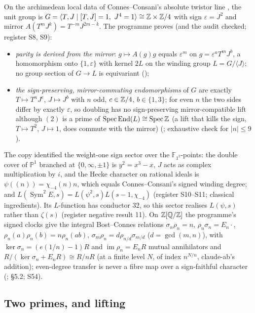On the archimedean local data of Connes--Consani's absolute twistor line \cite{CCtwistor}, the unit group is $G=\langle T,J\mid[T,J]=1,\ J^4=1\rangle\cong\ZZ\times\ZZ/4$ with sign $\varepsilon=J^2$ and mirror $A(T^mJ^k)=T^{-m}J^{2m-k}$. The programme proves (and the audit checked; register S8, S9):
\begin{itemize}
\item \emph{parity is derived from the mirror}: $g\mapsto A(g)g$ equals $\varepsilon^m$ on $g=\varepsilon^aT^mJ^b$, a homomorphism onto $\{1,\varepsilon\}$ with kernel $2L$ on the winding group $L=G/\langle J\rangle$; no group section of $G\to L$ is equivariant ();
\item \emph{the sign-preserving, mirror-commuting endomorphisms} of $G$ are exactly $T\mapsto T^nJ^c$, $J\mapsto J^b$ with $n$ odd, $c\in\mathbb{Z}/4$, $b\in\{1,3\}$; for even $n$ the two sides differ by exactly $\varepsilon$, so doubling has no sign-preserving mirror-compatible lift although $(2)$ is a prime of $\operatorname{Spec}\operatorname{End}(L)\cong\operatorname{Spec}\mathbb{Z}$ (a lift that kills the sign, $T\mapsto T^2$, $J\mapsto1$, does commute with the mirror) (; exhaustive check for $|n|\le9$).
\end{itemize}
The copy identified the weight-one sign sector over the $\mathbb{F}_{1^2}$-points: the double cover of $\mathbb{P}^1$ branched at $\{0,\infty,\pm1\}$ is $y^2=x^3-x$, $J$ acts as complex multiplication by $i$, and the Hecke character on rational ideals is $\psi((n))=\chi_{-4}(n)n$, which equals Connes--Consani's signed winding degree; and $L(\operatorname{Sym}^2E,s)=L(\psi^2,s)L(s-1,\chi_{-4})$ (register S10--S11; classical ingredients). Its $L$-function has conductor $32$, so this sector realises $L(\psi,s)$ rather than $\zeta(s)$ (register negative result 11).
On $\mathbb{Z}[\mathbb{Q}/\mathbb{Z}]$ the programme's signed clocks give the integral Bost--Connes relations $\sigma_n\rho_n=n$, $\rho_n\sigma_n=E_n\cdot$, $\rho_n(a)\rho_n(b)=n\rho_n(ab)$, $\sigma_m\rho_n=d\rho_{n/d}\sigma_{m/d}$ ($d=\gcd(m,n)$), with $\ker\sigma_n=(e(1/n)-1)R$ and $\operatorname{im}\rho_n=E_nR$ mutual annihilators and $R/(\ker\sigma_n+E_nR)\cong R/nR$ (at a finite level $N$, of index $n^{N/n}$, claude-ab's addition); even-degree transfer is never a fibre map over a sign-faithful character (;  §5.2; S54).

\subsection{Two primes, and lifting}

